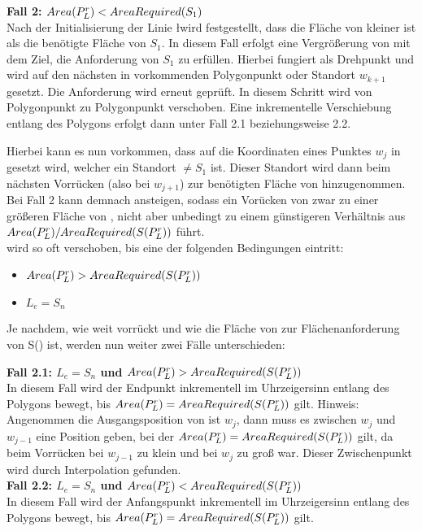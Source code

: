 \documentclass[ngerman]{seminarbeitrag}
\begin{document}
\textbf{Fall 2: $Area(P_{L}^{r})<AreaRequired(S_{1})$} \\
Nach der Initialisierung der Linie \l wird festgestellt, dass die Fläche von \prl kleiner ist als die benötigte Fläche von $S_{1}$. In diesem Fall erfolgt eine Vergrößerung von \ar{\mprl} mit dem Ziel, die Anforderung von $S_{1}$ zu erfüllen. Hierbei fungiert \ls als Drehpunkt und \Le wird auf den nächsten in \w vorkommenden Polygonpunkt oder Standort $w_{k+1}$ gesetzt. Die Anforderung wird erneut geprüft. In diesem Schritt wird \Le von Polygonpunkt zu Polygonpunkt verschoben. Eine inkrementelle Verschiebung entlang des Polygons erfolgt dann unter Fall 2.1 beziehungsweise 2.2.

Hierbei kann es nun vorkommen, dass \Le auf die Koordinaten eines Punktes $w_{j}$ in \w gesetzt wird, welcher ein Standort $\ne S_{1}$ ist. Dieser Standort wird dann beim nächsten Vorrücken (also bei $w_{j+1}$) zur benötigten Fläche von \prl hinzugenommen. Bei Fall 2 kann \arreq{\mprl} demnach ansteigen, sodass ein Vorücken von \Le zwar zu einer größeren Fläche von \prl, nicht aber unbedingt zu einem günstigeren Verhältnis aus $Area(P_{L}^{r}) / AreaRequired(S(P_{L}^{r}))$ führt. \\
\Le wird so oft verschoben, bis eine der folgenden Bedingungen eintritt:\\

\begin{itemize}
\item $Area(P_{L}^{r})>AreaRequired(S(P_{L}^{r}))$
\item $L_{e} = S_{n}$
\end{itemize}

Je nachdem, wie weit \Le vorrückt und wie die Fläche von \prl zur Flächenanforderung von S(\prl) ist, werden nun weiter zwei Fälle unterschieden:

\textbf{Fall 2.1: $L_{e} = S_{n}$ und $Area(P_{L}^{r})>AreaRequired(S(P_{L}^{r}))$} \\
In diesem Fall wird der Endpunkt \Le inkrementell im Uhrzeigersinn entlang des Polygons bewegt, bis $Area(P_{L}^{r})=AreaRequired(S(P_{L}^{r}))$ gilt.
Hinweis: Angenommen die Ausgangsposition von \Le ist $w_{j}$, dann muss es zwischen $w_{j}$ und $w_{j-1}$ eine Position geben, bei der $Area(P_{L}^{r})=AreaRequired(S(P_{L}^{r}))$ gilt, da beim Vorrücken \ar{\mprl} bei $w_{j-1}$ zu klein und bei $w_{j}$ zu groß war. Dieser Zwischenpunkt wird durch Interpolation gefunden.\\

\textbf{Fall 2.2: $L_{e} = S_{n}$ und $Area(P_{L}^{r})<AreaRequired(S(P_{L}^{r}))$} \\
In diesem Fall wird der Anfangspunkt \ls inkrementell im Uhrzeigersinn entlang des Polygons bewegt, bis $Area(P_{L}^{r})=AreaRequired(S(P_{L}^{r}))$ gilt.
\end{document}
